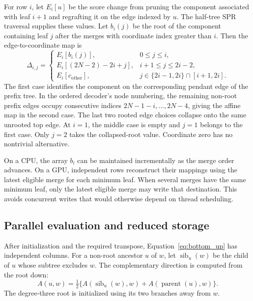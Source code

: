 For row $i$, let $E_i[u]$ be the score change from pruning the component associated with leaf $i+1$ and regrafting it on the edge indexed by $u$.
The half-tree SPR traversal supplies these values.
Let $b_i(j)$ be the root of the component containing leaf $j$ after the merges with coordinate index greater than $i$.
Then the edge-to-coordinate map is
\begin{equation}
 \Delta_{i,j}=
 \begin{cases}
 E_i[b_i(j)], &0\leq j\leq i,\\[2pt]
 E_i[(2N-2)-2i+j], &i+1\leq j\leq2i-2,\\[2pt]
 E_i[c_{\mathrm{other}}], &j\in\{2i-1,2i\}\cap[i+1,2i].
 \end{cases}
 \label{eq:full_mapping}
\end{equation}
The first case identifies the component on the corresponding pendant edge of the prefix tree.
In the ordered decoder's node numbering, the remaining non-root prefix edges occupy consecutive indices $2N-1-i,\ldots,2N-4$, giving the affine map in the second case.
The last two rooted edge choices collapse onto the same unrooted top edge.
At $i=1$, the middle case is empty and $j=1$ belongs to the first case.
Only $j=2$ takes the collapsed-root value.
Coordinate zero has no nontrivial alternative.

On a CPU, the array $b_i$ can be maintained incrementally as the merge order advances.
On a GPU, independent rows reconstruct their mappings using the latest eligible merge for each minimum leaf.
When several merges have the same minimum leaf, only the latest eligible merge may write that destination.
This avoids concurrent writes that would otherwise depend on thread scheduling.

\subsection{Parallel evaluation and reduced storage}
\label{sec:parallel_details}

After initialization and the required transpose, Equation~\eqref{eq:bottom_up} has independent columns.
For a non-root ancestor $u$ of $w$, let $\operatorname{sib}_u(w)$ be the child of $u$ whose subtree excludes $w$.
The complementary direction is computed from the root down:
\begin{equation}
 A(u,w)=\tfrac12\{A(\operatorname{sib}_u(w),w)
                         +A(\operatorname{parent}(u),w)\}.
 \label{eq:top_down}
\end{equation}
The degree-three root is initialized using its two branches away from $w$.

